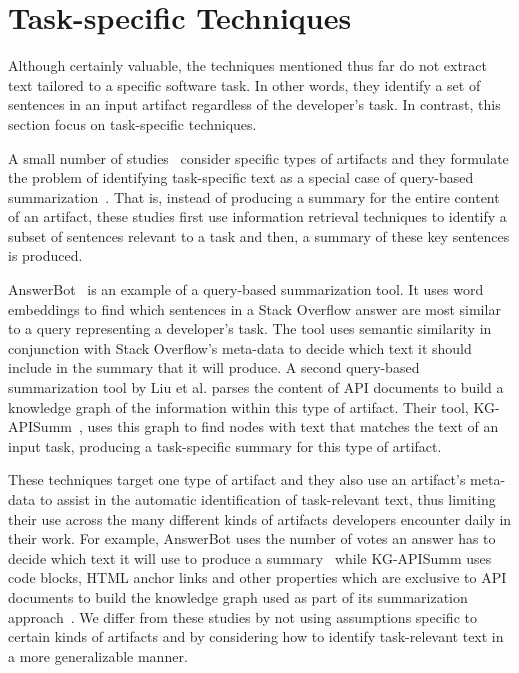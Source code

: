 



\section{Task-specific Techniques}
\label{cp2:task-approaches}



Although certainly valuable, the techniques mentioned thus far
do not extract text tailored to 
a specific software task. In other words, they identify 
a set of sentences in an input artifact regardless of the developer's task. 
In contrast, this section focus on task-specific techniques.

A small number of studies~\cite{Xu2017, silva2019, liu2019qapi} consider specific types of artifacts and
they formulate the problem of identifying task-specific text as 
a special case of query-based summarization~\cite{Goldsteinet1999}. That is, 
instead of producing a summary for the entire content of 
an artifact,
these studies first use information retrieval techniques
to identify a subset 
of sentences relevant to a task and then, 
a summary of these key sentences is produced.



AnswerBot~\cite{Xu2017} is an example of a query-based summarization tool.
It uses word embeddings to find which sentences in a Stack Overflow answer 
are most similar to a query representing a developer's task.
The tool uses semantic similarity in conjunction with 
Stack Overflow's meta-data to decide which text  it should include
in the summary that it will produce. 
A second query-based summarization tool by Liu et al. parses the content 
of API documents to build a knowledge graph of the information within this type of artifact. 
Their tool, KG-APISumm~\cite{liu2019qapi}, uses this graph 
to find nodes with text that matches the text of an input task, 
producing a task-specific summary for this type of artifact. 


These techniques
target one type of artifact and they also use an artifact's meta-data to 
assist in the automatic identification of task-relevant text, thus
limiting their use across the
many different kinds of artifacts developers encounter
daily in their work. 
For example, AnswerBot uses the number of votes an answer has to decide which text it will use to produce a summary~\cite{Xu2017}
while KG-APISumm uses 
code blocks, HTML anchor links and other properties which are exclusive to API documents to build the knowledge graph used as part of its summarization approach~\cite{liu2019qapi}.
We differ from these studies 
by not using assumptions 
specific to certain kinds of artifacts
and by considering how to identify task-relevant text 
in a more generalizable manner.





